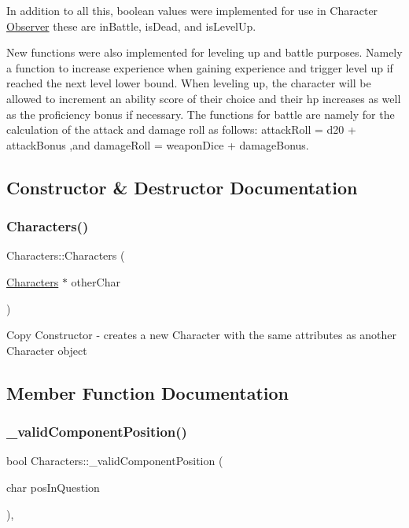 In addition to all this, boolean values were implemented for use in Character \hyperlink{class_observer}{Observer} these are in\+Battle, is\+Dead, and is\+Level\+Up.

New functions were also implemented for leveling up and battle purposes. Namely a function to increase experience when gaining experience and trigger level up if reached the next level lower bound. When leveling up, the character will be allowed to increment an ability score of their choice and their hp increases as well as the proficiency bonus if necessary. The functions for battle are namely for the calculation of the attack and damage roll as follows\+: attack\+Roll = d20 + attack\+Bonus ,and damage\+Roll = weapon\+Dice + damage\+Bonus. 

\subsection{Constructor \& Destructor Documentation}
\hypertarget{class_characters_a695ed5b59463f54d4eb52a551a25949b}{}\label{class_characters_a695ed5b59463f54d4eb52a551a25949b} 
\subsubsection{\texorpdfstring{Characters()}{Characters()}}
{\footnotesize\ttfamily Characters\+::\+Characters (\begin{DoxyParamCaption}\item[{\hyperlink{class_characters}{Characters} $\ast$}]{other\+Char }\end{DoxyParamCaption})}

Copy Constructor -\/ creates a new Character with the same attributes as another Character object 

\subsection{Member Function Documentation}
\hypertarget{class_characters_af2c85f79c62aba2dbf3e8d77e20ffb52}{}\label{class_characters_af2c85f79c62aba2dbf3e8d77e20ffb52} 
\subsubsection{\texorpdfstring{\+\_\+valid\+Component\+Position()}{\_validComponentPosition()}}
{\footnotesize\ttfamily bool Characters\+::\+\_\+valid\+Component\+Position (\begin{DoxyParamCaption}\item[{char}]{pos\+In\+Question }\end{DoxyParamCaption})\hspace{0.3cm}{\ttfamily [static]}, {\ttfamily [protected]}}

